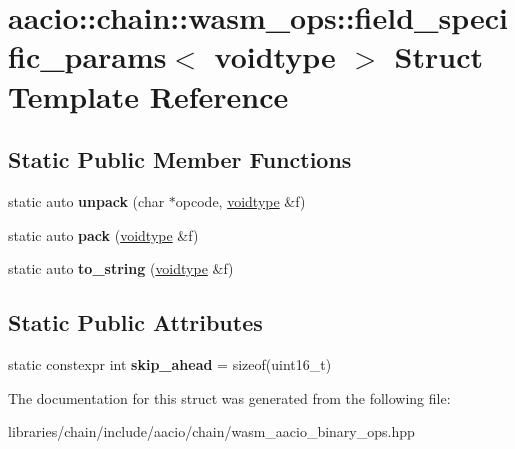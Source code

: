 \hypertarget{structaacio_1_1chain_1_1wasm__ops_1_1field__specific__params_3_01voidtype_01_4}{}\section{aacio\+:\+:chain\+:\+:wasm\+\_\+ops\+:\+:field\+\_\+specific\+\_\+params$<$ voidtype $>$ Struct Template Reference}
\label{structaacio_1_1chain_1_1wasm__ops_1_1field__specific__params_3_01voidtype_01_4}
\subsection*{Static Public Member Functions}
\begin{DoxyCompactItemize}
\item 
\mbox{\label{structaacio_1_1chain_1_1wasm__ops_1_1field__specific__params_3_01voidtype_01_4_a34daab2c64da8a872bf7becc67106cc9}} 
static auto {\bfseries unpack} (char $\ast$opcode, \mbox{\hyperlink{structaacio_1_1chain_1_1wasm__ops_1_1voidtype}{voidtype}} \&f)
\item 
\mbox{\label{structaacio_1_1chain_1_1wasm__ops_1_1field__specific__params_3_01voidtype_01_4_a204aa0ba01b77ab9e9d42a938defc06e}} 
static auto {\bfseries pack} (\mbox{\hyperlink{structaacio_1_1chain_1_1wasm__ops_1_1voidtype}{voidtype}} \&f)
\item 
\mbox{\label{structaacio_1_1chain_1_1wasm__ops_1_1field__specific__params_3_01voidtype_01_4_afa6ad0582867364db27aa75471c50a21}} 
static auto {\bfseries to\+\_\+string} (\mbox{\hyperlink{structaacio_1_1chain_1_1wasm__ops_1_1voidtype}{voidtype}} \&f)
\end{DoxyCompactItemize}
\subsection*{Static Public Attributes}
\begin{DoxyCompactItemize}
\item 
\mbox{\label{structaacio_1_1chain_1_1wasm__ops_1_1field__specific__params_3_01voidtype_01_4_a4a525132b70cabca9bc2e7f705bb669b}} 
static constexpr int {\bfseries skip\+\_\+ahead} = sizeof(uint16\+\_\+t)
\end{DoxyCompactItemize}


The documentation for this struct was generated from the following file\+:\begin{DoxyCompactItemize}
\item 
libraries/chain/include/aacio/chain/wasm\+\_\+aacio\+\_\+binary\+\_\+ops.\+hpp\end{DoxyCompactItemize}
